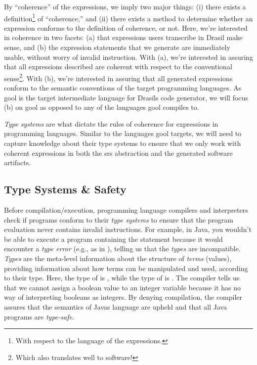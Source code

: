 By ``coherence'' of the expressions, we imply two major things: (i) there exists
a definition\footnote{With respect to the language of the expressions.} of
``coherence,'' and (ii) there exists a method to determine whether an expression
conforms to the definition of coherence, or not. Here, we're interested in
coherence in two facets: (a) that expressions users transcribe in Drasil make
sense, and (b) the expression statements that we generate are immediately
usable, without worry of invalid instruction. With (a), we're interested in
assuring that all expressions described are coherent with respect to the
conventional sense\footnote{Which also translates well to software!}. With (b),
we're interested in assuring that all generated expressions conform to the
semantic conventions of the target programming languages. As \acs{gool} is the
target intermediate language for Drasils code generator, we will focus (b) on
\acs{gool} as opposed to any of the languages \acs{gool} compiles to.

\textit{Type systems} are what dictate the rules of coherence for expressions in
programming languages. Similar to the languages \acs{gool} targets, we will need
to capture knowledge about their type systems to ensure that we only work with
coherent expressions in both the \acs{srs} abstraction and the generated
software artifacts.

\subsection{Type Systems \& Safety}
\label{chap:typedExpr:sec:coherence:subsec:type-safety}

\pseudoExampleJavaTypeError{}

Before compilation/execution, programming language compilers and interpreters
check if programs conform to their \textit{type systems} to ensure that the
program evaluation never contains invalid instructions. For example, in Java,
you wouldn't be able to execute a program containing the statement
 because it would encounter a \textit{type
error} (e.g., as in ), telling us that the
\textit{types} are incompatible. \textit{Types} are the meta-level information
about the structure of \textit{terms} (values), providing information about how
terms can be manipulated and used, according to their type. Here, the type of
 is , while the type of
 is . The compiler tells us that
we cannot assign a boolean value to an integer variable because it has no way of
interpreting booleans as integers. By denying compilation, the compiler assures
that the semantics of Javas language are upheld and that all Java programs are
\textit{type-safe}.

